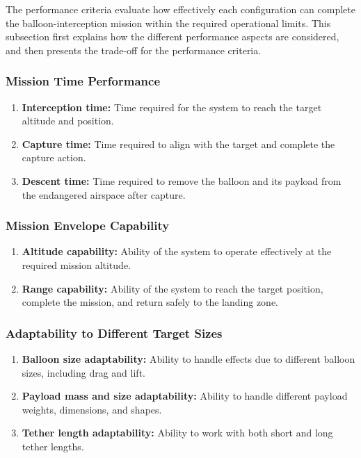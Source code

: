 The performance criteria evaluate how effectively each configuration can complete the balloon-interception mission within the required operational limits. This subsection first explains how the different performance aspects are considered, and then presents the trade-off for the performance criteria.

\subsubsection*{Mission Time Performance}
\begin{enumerate}
    \item \textbf{Interception time:} Time required for the system to reach the target altitude and position.
    \item \textbf{Capture time:} Time required to align with the target and complete the capture action.
    \item \textbf{Descent time:} Time required to remove the balloon and its payload from the endangered airspace after capture. 
\end{enumerate}

\subsubsection*{Mission Envelope Capability}
\begin{enumerate}
    \item \textbf{Altitude capability:} Ability of the system to operate effectively at the required mission altitude.
    \item \textbf{Range capability:} Ability of the system to reach the target position, complete the mission, and return safely to the landing zone.
\end{enumerate}

\subsubsection*{Adaptability to Different Target Sizes}
\begin{enumerate}
    \item \textbf{Balloon size adaptability:} Ability to handle effects due to different balloon sizes, including drag and lift.
    \item \textbf{Payload mass and size adaptability:} Ability to handle different payload weights, dimensions, and shapes.
    \item \textbf{Tether length adaptability:} Ability to work with both short and long tether lengths.
\end{enumerate}

